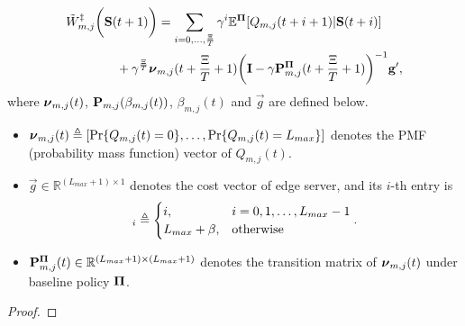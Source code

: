\begin{lemma}
    \label{lemma:w_es}
    {\small
    \begin{align}
        &\tilde{W}^{\ddagger}_{m,j}\bigg(\mathbf{S}(t+1)\bigg)
    = \sum_{i=0,\dots,\frac{\Xi}{T}} \gamma^{i} \mathbb{E}^{\boldsymbol{\Pi}}[ Q_{m,j}({t+i+1}) | \mathbf{S}(t+i)]
    \nonumber\\
    &~~~~~~~~~~~~+ \gamma^{\frac{\Xi}{T}} 
    \boldsymbol{\nu}_{m,j}({t+\frac{\Xi}{T}+1})
    \bigg(
        \mathbf{I} - \gamma \mathbf{P}^{\boldsymbol{\Pi}}_{m,j}(t+\frac{\Xi}{T}+1)
    \bigg)^{-1} \mathbf{g}',
        \label{w_es}
    \end{align}   
    }
    where $\boldsymbol{\nu}_{m,j}(t)$, $\mathbf{P}_{m,j}(\beta_{m,j}(t))$, $\beta_{m,j}(t)$ and $\vec{g}$ are defined below.
    \begin{itemize}
        \item {\small
        $\boldsymbol{\nu}_{m,j}(t) \triangleq [\Pr\{Q_{m,j}(t)=0\}, \dots, \Pr\{Q_{m,j}(t)=L_{max}\}]$
        } denotes the PMF (probability mass function) vector of $Q_{m,j}(t)$.
        \item $\vec{g} \in \mathbb{R}^{(L_{max}+1) \times 1}$ denotes the cost vector of edge server, and its $i$-th entry is
        \begin{align}
            [\vec{g}]_{i} \define 
            \begin{cases}
                i, & i=0,1,\dots,L_{max}-1
                \\
                L_{max}+\beta, & \text{otherwise}
            \end{cases}.
            \label{eqn:g_vec}
        \end{align}
        \item $\mathbf{P}^{\boldsymbol{\Pi}}_{m,j}(t) \in \mathbb{R}^{(L_{max}+1) \times (L_{max}+1)}$ denotes the transition matrix of $\boldsymbol{\nu}_{m,j}(t)$ under baseline policy $\boldsymbol{\Pi}$. %
    \end{itemize}   
\end{lemma}
\begin{proof}
\end{proof}

